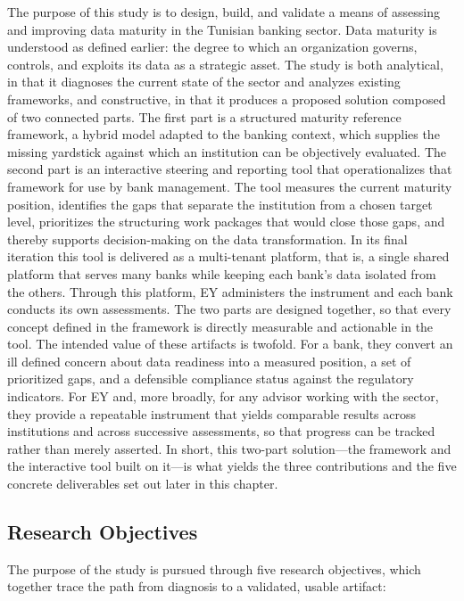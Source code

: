 The purpose of this study is to design, build, and validate a means of assessing and improving data maturity in the Tunisian banking sector. Data maturity is understood as defined earlier: the degree to which an organization governs, controls, and exploits its data as a strategic asset. The study is both analytical, in that it diagnoses the current state of the sector and analyzes existing frameworks, and constructive, in that it produces a proposed solution composed of two connected parts. The first part is a structured maturity reference framework, a hybrid model adapted to the banking context, which supplies the missing yardstick against which an institution can be objectively evaluated. The second part is an interactive steering and reporting tool that operationalizes that framework for use by bank management. The tool measures the current maturity position, identifies the gaps that separate the institution from a chosen target level, prioritizes the structuring work packages that would close those gaps, and thereby supports decision-making on the data transformation. In its final iteration this tool is delivered as a multi-tenant platform, that is, a single shared platform that serves many banks while keeping each bank's data isolated from the others. Through this platform, EY administers the instrument and each bank conducts its own assessments. The two parts are designed together, so that every concept defined in the framework is directly measurable and actionable in the tool. The intended value of these artifacts is twofold. For a bank, they convert an ill defined concern about data readiness into a measured position, a set of prioritized gaps, and a defensible compliance status against the regulatory indicators. For EY and, more broadly, for any advisor working with the sector, they provide a repeatable instrument that yields comparable results across institutions and across successive assessments, so that progress can be tracked rather than merely asserted. In short, this two-part solution---the framework and the interactive tool built on it---is what yields the three contributions and the five concrete deliverables set out later in this chapter.

\subsection{Research Objectives}

The purpose of the study is pursued through five research objectives, which together trace the path from diagnosis to a validated, usable artifact:

